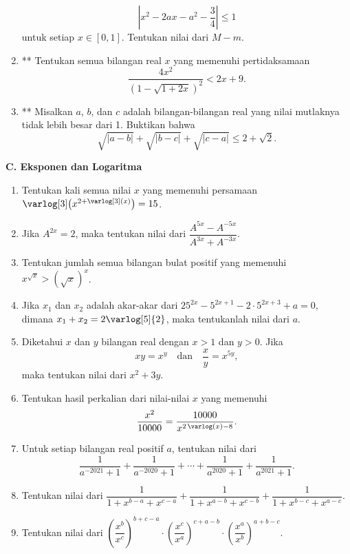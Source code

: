 \documentclass[12pt]{article}
\newcommand*\func[2]{\mathop{}\!{#1}{\left({#2}\right)}}
\let\log\varlog
\begin{document}
\begin{enumerate}[leftmargin=*]
		\[ \left|x^{2} - 2ax - a^{2} - \frac{3}{4}\right| \leq 1 \]
		untuk setiap $ x \in \left[0, 1\right] $. Tentukan nilai dari $ M - m $.
		\item** Tentukan semua bilangan real $ x $ yang memenuhi pertidaksamaan
		\[ \frac{4x^{2}}{\left(1 - \sqrt{1 + 2x}\right)^{2}} < 2x + 9. \]
		\item** Misalkan $ a $, $ b $, dan $ c $ adalah bilangan-bilangan real yang nilai mutlaknya tidak lebih besar dari 1. Buktikan bahwa
		\[ \sqrt{\left|a - b\right|} + \sqrt{\left|b - c\right|} + \sqrt{\left|c - a\right|} \leq 2 + \sqrt{2}. \]
	\end{enumerate}
	
	\newpage
	
	\noindent \textbf{C. Eksponen dan Logaritma}
	\begin{enumerate}[leftmargin=*]
		\item Tentukan kali semua nilai $ x $ yang memenuhi persamaan $ \func{\log[3]}{x^{2 + \func{\log[3]}{x}}} = 15 $.
		\item Jika $ A^{2x} = 2 $, maka tentukan nilai dari $ \dfrac{A^{5x} - A^{-5x}}{A^{3x} + A^{-3x}} $.
		\item Tentukan jumlah semua bilangan bulat positif yang memenuhi $ x^{\sqrt{x}} > \left(\sqrt{x}\right)^{x} $.
		\item Jika $ x_{1} $ dan $ x_{2} $ adalah akar-akar dari $ 25^{2x} - 5^{2x + 1} - 2 \cdot 5^{2x + 3} + a = 0 $, dimana $ x_{1} + x_{2} = 2\log[5]{2} $, maka tentukanlah nilai dari $ a $.
		\item Diketahui $ x $ dan $ y $ bilangan real dengan $ x > 1 $ dan $ y > 0 $. Jika
		\[ xy = x^{y} \quad \mbox{dan} \quad \frac{x}{y} = x^{5y}, \]
		maka tentukan nilai dari $ x^{2} + 3y $.
		\item Tentukan hasil perkalian dari nilai-nilai $ x $ yang memenuhi
		\[ \frac{x^{2}}{10000} = \frac{10000}{x^{2\func{\log}{x} - 8}}. \]
		\item Untuk setiap bilangan real positif $ a $, tentukan nilai dari
		\[ \frac{1}{a^{-2021} + 1} + \frac{1}{a^{-2020} + 1} + \cdots + \frac{1}{a^{2020} + 1} + \frac{1}{a^{2021} + 1}. \]
		\item Tentukan nilai dari $ \dfrac{1}{1 + x^{b - a} + x^{c - a}} + \dfrac{1}{1 + x^{a - b} + x^{c - b}} + \dfrac{1}{1 + x^{b - c} + x^{a - c}} $.
		\item Tentukan nilai dari $ \left(\dfrac{x^{b}}{x^{c}}\right)^{b + c - a} \cdot \left(\dfrac{x^{c}}{x^{a}}\right)^{c + a - b} \cdot \left(\dfrac{x^{a}}{x^{b}}\right)^{a + b - c} $.

\end{enumerate}
\end{document}
